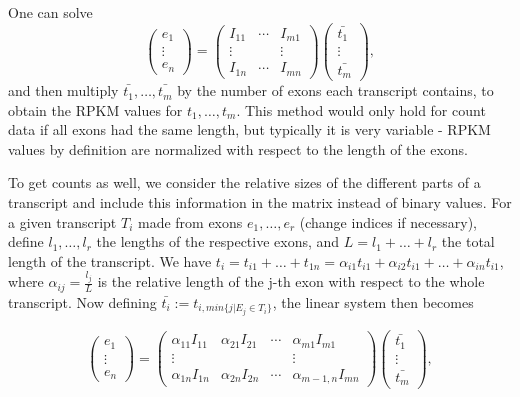 \documentclass[a4paper,11pt]{article}
\begin{document}
One can solve
$$
\begin{pmatrix}
e_1 \\ \vdots \\ e_n
\end{pmatrix}
=
\begin{pmatrix}
I_{11} & \cdots & I_{m1} \\
\vdots &        & \vdots \\
I_{1n} & \cdots & I_{mn}
\end{pmatrix}
\begin{pmatrix}
\bar{t_1} \\ \vdots \\ \bar{t_m}
\end{pmatrix},
$$
and then multiply $\bar{t_1},\ldots,\bar{t_m}$ by the number of exons each transcript contains, to obtain the RPKM values for $t_1,\ldots,t_m$. This method would only hold for count data if all exons had the same length, but typically it is very variable - RPKM values by definition are normalized with respect to the length of the exons.

To get counts as well, we consider the relative sizes of the different parts of a transcript and include this information in the matrix instead of binary values. For a given transcript $T_i$ made from exons $e_1,\ldots,e_r$ (change indices if necessary), define $l_1,\ldots,l_r$ the lengths of the respective exons, and $L=l_1+\ldots+l_r$ the total length of the transcript. We have $t_i = t_{i1} + \ldots + t_{1n} = \alpha_{i1} t_{i1} + \alpha_{i2} t_{i1} + \ldots + \alpha_{in} t_{i1}$, where $\alpha_{ij} = \frac{l_j}{L}$ is the relative length of the j-th exon with respect to the whole transcript. Now defining $\bar{t_i} := t_{i,min\{j|E_j\in T_i\}}$, the linear system then becomes 

$$
\begin{pmatrix}
e_1 \\ \vdots \\ e_n
\end{pmatrix}
=
\begin{pmatrix}
\alpha_{11}I_{11} & \alpha_{21}I_{21} &\cdots & \alpha_{m1}I_{m1} \\
\vdots &                              &       & \vdots \\
\alpha_{1n}I_{1n} & \alpha_{2n}I_{2n} &\cdots & \alpha_{m-1,n}I_{mn}
\end{pmatrix}
\begin{pmatrix}
\bar{t_1} \\ \vdots \\ \bar{t_m}
\end{pmatrix},
$$
\\
\end{document}
